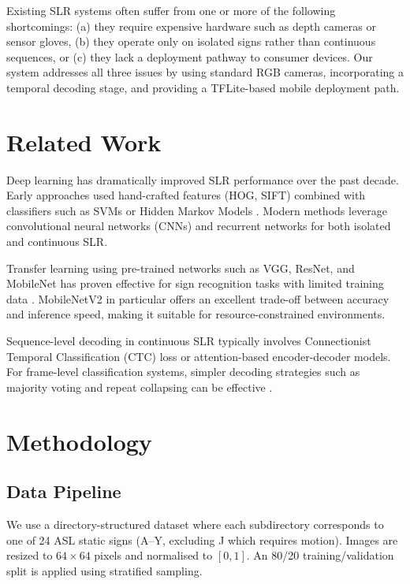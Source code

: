 \documentclass[12pt, a4paper]{article}
\begin{document}
Existing SLR systems often suffer from one or more of the following shortcomings: (a) they require expensive hardware such as depth cameras or sensor gloves, (b) they operate only on isolated signs rather than continuous sequences, or (c) they lack a deployment pathway to consumer devices. Our system addresses all three issues by using standard RGB cameras, incorporating a temporal decoding stage, and providing a TFLite-based mobile deployment path.

\section{Related Work}

Deep learning has dramatically improved SLR performance over the past decade. Early approaches used hand-crafted features (HOG, SIFT) combined with classifiers such as SVMs or Hidden Markov Models \cite{koller2015continuous}. Modern methods leverage convolutional neural networks (CNNs) and recurrent networks for both isolated and continuous SLR.

Transfer learning using pre-trained networks such as VGG, ResNet, and MobileNet has proven effective for sign recognition tasks with limited training data \cite{sandler2018mobilenetv2}. MobileNetV2 in particular offers an excellent trade-off between accuracy and inference speed, making it suitable for resource-constrained environments.

Sequence-level decoding in continuous SLR typically involves Connectionist Temporal Classification (CTC) loss or attention-based encoder-decoder models. For frame-level classification systems, simpler decoding strategies such as majority voting and repeat collapsing can be effective \cite{graves2006ctc}.

\section{Methodology}

\subsection{Data Pipeline}

We use a directory-structured dataset where each subdirectory corresponds to one of 24 ASL static signs (A--Y, excluding J which requires motion). Images are resized to $64 \times 64$ pixels and normalised to $[0, 1]$. An 80/20 training/validation split is applied using stratified sampling.
\end{document}
